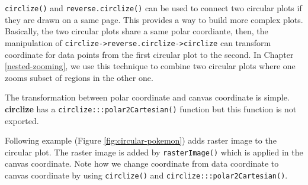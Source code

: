 \documentclass[]{book}
\begin{document}
\texttt{circlize()} and \texttt{reverse.circlize()} can be used to
connect two circular plots if they are drawn on a same page. This
provides a way to build more complex plots. Basically, the two circular
plots share a same polar coordiante, then, the manipulation of
\texttt{circlize-\textgreater{}reverse.circlize-\textgreater{}circlize}
can transform coordinate for data points from the first circular plot to
the second. In Chapter \ref{nested-zooming}, we use this technique to
combine two circular plots where one zooms subset of regions in the
other one.

The transformation between polar coordinate and canvas coordinate is
simple. \textbf{circlize} has a \texttt{circlize:::polar2Cartesian()}
function but this function is not exported.

Following example (Figure \ref{fig:circular-pokemon}) adds raster image
to the circular plot. The raster image is added by
\texttt{rasterImage()} which is applied in the canvas coordinate. Note
how we change coordinate from data coordinate to canvas coordinate by
using \texttt{circlize()} and \texttt{circlize:::polar2Cartesian()}.
\end{document}
